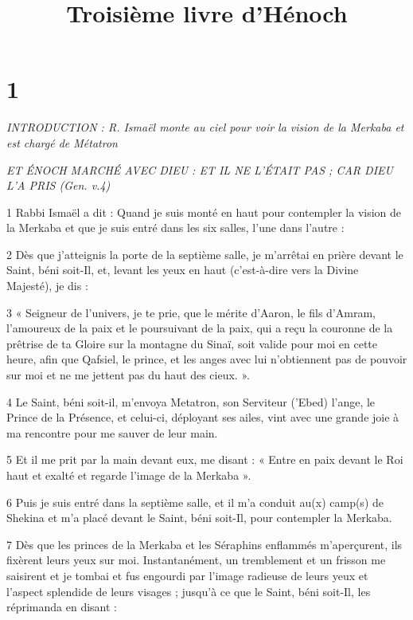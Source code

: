 

\title{Troisième livre d'Hénoch}

\chapter{1}

\par \textit{INTRODUCTION : R. Ismaël monte au ciel pour voir la vision de la Merkaba et est chargé de Métatron}

\par \textit{ET ÉNOCH MARCHÉ AVEC DIEU : ET IL NE L'ÉTAIT PAS ; CAR DIEU L'A PRIS (Gen. v.4)}

\par 1 Rabbi Ismaël a dit : Quand je suis monté en haut pour contempler la vision de la Merkaba et que je suis entré dans les six salles, l'une dans l'autre :

\par 2 Dès que j'atteignis la porte de la septième salle, je m'arrêtai en prière devant le Saint, béni soit-Il, et, levant les yeux en haut (c'est-à-dire vers la Divine Majesté), je dis :

\par 3 « Seigneur de l'univers, je te prie, que le mérite d'Aaron, le fils d'Amram, l'amoureux de la paix et le poursuivant de la paix, qui a reçu la couronne de la prêtrise de ta Gloire sur la montagne du Sinaï, soit valide pour moi en cette heure, afin que Qafsiel, le prince, et les anges avec lui n'obtiennent pas de pouvoir sur moi et ne me jettent pas du haut des cieux. ».

\par 4 Le Saint, béni soit-il, m'envoya Metatron, son Serviteur ('Ebed) l'ange, le Prince de la Présence, et celui-ci, déployant ses ailes, vint avec une grande joie à ma rencontre pour me sauver de leur main.

\par 5 Et il me prit par la main devant eux, me disant : « Entre en paix devant le Roi haut et exalté et regarde l'image de la Merkaba ».

\par 6 Puis je suis entré dans la septième salle, et il m'a conduit au(x) camp(s) de Shekina et m'a placé devant le Saint, béni soit-Il, pour contempler la Merkaba.

\par 7 Dès que les princes de la Merkaba et les Séraphins enflammés m'aperçurent, ils fixèrent leurs yeux sur moi. Instantanément, un tremblement et un frisson me saisirent et je tombai et fus engourdi par l'image radieuse de leurs yeux et l'aspect splendide de leurs visages ; jusqu'à ce que le Saint, béni soit-Il, les réprimanda en disant :


